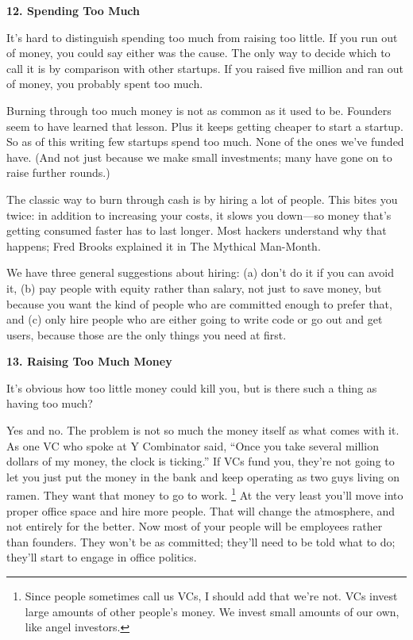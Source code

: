 \textbf{12. Spending Too Much}

It's hard to distinguish spending too much from raising too little. If
you run out of money, you could say either was the cause. The only way
to decide which to call it is by comparison with other startups. If you
raised five million and ran out of money, you probably spent too much.

Burning through too much money is not as common as it used to be.
Founders seem to have learned that lesson. Plus it keeps getting cheaper
to start a startup. So as of this writing few startups spend too much.
None of the ones we've funded have. (And not just because we make small
investments; many have gone on to raise further rounds.)

The classic way to burn through cash is by hiring a lot of people. This
bites you twice: in addition to increasing your costs, it slows you
down---so money that's getting consumed faster has to last longer. Most
hackers understand why that happens; Fred Brooks explained it in The
Mythical Man-Month.

We have three general suggestions about hiring: (a) don't do it if you
can avoid it, (b) pay people with equity rather than salary, not just to
save money, but because you want the kind of people who are committed
enough to prefer that, and (c) only hire people who are either going to
write code or go out and get users, because those are the only things
you need at first.

\textbf{13. Raising Too Much Money}

It's obvious how too little money could kill you, but is there such a
thing as having too much?

Yes and no. The problem is not so much the money itself as what comes
with it. As one VC who spoke at Y Combinator said, ``Once you take
several million dollars of my money, the clock is ticking.'' If VCs fund
you, they're not going to let you just put the money in the bank and
keep operating as two guys living on ramen. They want that money to go
to work. \footnote{Since people sometimes call us VCs, I should add that we're not.
VCs invest large amounts of other people's money. We invest small
amounts of our own, like angel investors.} At the very least you'll move into
proper office space and hire more people. That will change the
atmosphere, and not entirely for the better. Now most of your people
will be employees rather than founders. They won't be as committed;
they'll need to be told what to do; they'll start to engage in office
politics.

